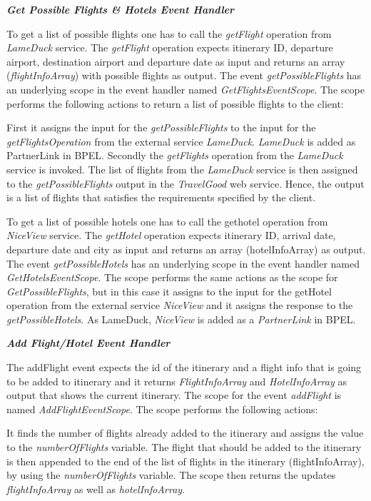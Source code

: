 \textbf{\textit{Get Possible Flights \& Hotels Event Handler}}

To get a list of possible flights one has to call the \textit{getFlight} operation from \textit{LameDuck} service. The \textit{getFlight} operation expects itinerary ID, departure airport, destination airport and departure date as input and returns an array (\textit{flightInfoArray}) with possible flights as output. The event \textit{getPossibleFlights} has an underlying scope in the event handler named \textit{GetFlightsEventScope}. The scope performs the following actions to return a list of possible flights to the client:
 
First it assigns the input for the \textit{getPossibleFlights} to the input for the \textit{getFlightsOperation} from the external service \textit{LameDuck}. \textit{LameDuck} is added as PartnerLink in BPEL.
Secondly the \textit{getFlights} operation from the \textit{LameDuck} service is invoked.
The list of flights from the \textit{LameDuck} service is then assigned to the \textit{getPossibleFlights} output in the \textit{TravelGood} web service. Hence, the output is a list of flights that satisfies the requirements specified by the client.
 
To get a list of possible hotels one has to call the gethotel operation from \textit{NiceView} service. The \textit{getHotel} operation expects itinerary ID, arrival date, departure date and city as input and returns an array (hotelInfoArray) as output. The event \textit{getPossibleHotels} has an underlying scope in the event handler named \textit{GetHotelsEventScope}. The scope performs the same actions as the scope for \textit{GetPossibleFlights}, but in this case it assigns to the input for the getHotel operation from the external service \textit{NiceView} and it assigns the response to the \textit{getPossibleHotels}. As LameDuck, \textit{NiceView} is added as a \textit{PartnerLink} in BPEL.


\textbf{\textit{Add Flight/Hotel Event Handler}}

The addFlight event expects the id of the itinerary and a flight info that is going to be added to itinerary and it returns \textit{FlightInfoArray} and \textit{HotelInfoArray} as output that shows the current itinerary. The scope for the event \textit{addFlight} is named \textit{AddFlightEventScope}. The scope performs the following actions:
 
It finds the number of flights already added to the itinerary and assigns the value to the \textit{numberOfFlights} variable.
The flight that should be added to the itinerary is then appended to the end of the list of flights in the itinerary (flightInfoArray), by using the \textit{numberOfFlights} variable.
The scope then returns the updates \textit{flightInfoArray} as well as \textit{hotelInfoArray}.

